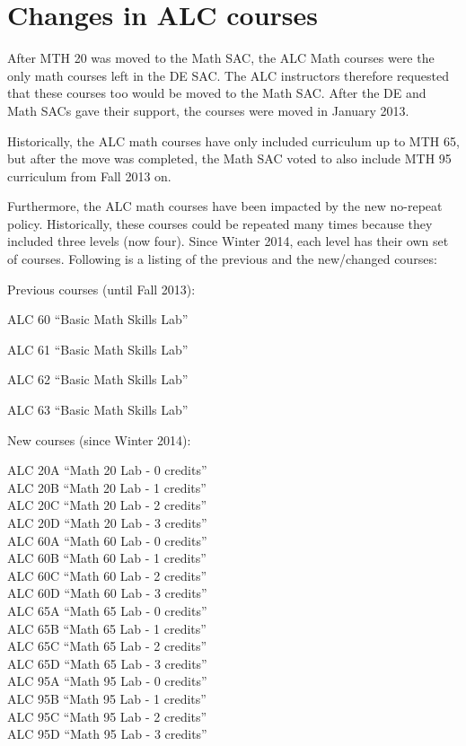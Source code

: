 \chapter{Changes in ALC courses}\label{app:sec:alc}
After MTH 20 was moved to the Math SAC, the ALC Math courses were the only math courses left in the DE SAC. The ALC instructors therefore requested that these courses too would be moved to the Math SAC. After the DE and Math SACs gave their support, the courses were moved in January 2013.

Historically, the ALC math courses have only included curriculum up to MTH 65, but after the move was completed, the Math SAC voted to also include MTH 95 curriculum from Fall 2013 on.

Furthermore, the ALC math courses have been impacted by the new no-repeat policy. Historically, these courses could be repeated many times because they included three levels (now four). Since Winter 2014, each level has their own set of courses. Following is a listing  of the previous and the new/changed courses:

Previous courses (until Fall 2013):

ALC 60 ``Basic Math Skills Lab''

ALC 61 ``Basic Math Skills Lab''

ALC 62 ``Basic Math Skills Lab''

ALC 63 ``Basic Math Skills Lab''

New courses (since Winter 2014):

ALC 20A ``Math 20 Lab - 0 credits'' \\
ALC 20B ``Math 20 Lab - 1 credits'' \\
ALC 20C ``Math 20 Lab - 2 credits'' \\
ALC 20D ``Math 20 Lab - 3 credits'' \\

ALC 60A ``Math 60 Lab - 0 credits'' \\
ALC 60B ``Math 60 Lab - 1 credits'' \\
ALC 60C ``Math 60 Lab - 2 credits'' \\
ALC 60D ``Math 60 Lab - 3 credits'' \\

ALC 65A ``Math 65 Lab - 0 credits'' \\
ALC 65B ``Math 65 Lab - 1 credits'' \\
ALC 65C ``Math 65 Lab - 2 credits'' \\
ALC 65D ``Math 65 Lab - 3 credits'' \\

ALC 95A ``Math 95 Lab - 0 credits'' \\
ALC 95B ``Math 95 Lab - 1 credits'' \\
ALC 95C ``Math 95 Lab - 2 credits'' \\
ALC 95D ``Math 95 Lab - 3 credits''
